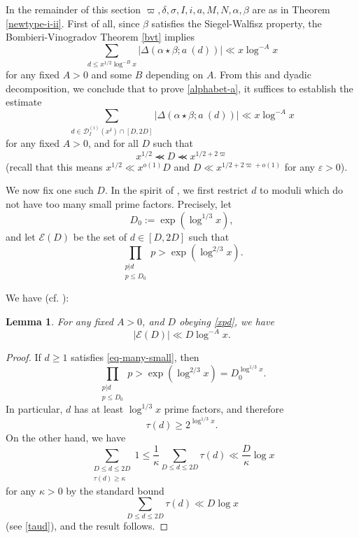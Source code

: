 \documentclass[12pt,a4paper,reqno]{amsart}
\numberwithin{equation}{section}
\theoremstyle{plain}
\newtheorem{lemma}[theorem]{Lemma}
\theoremstyle{definition}
\newcommand\eps{\varepsilon}
\newcommand{\DI}[3]{\mathcal{D}_{{#1}}^{({#2})}({#3})}
\renewcommand{\lessapprox}{\llcurly}
\begin{document}
In the remainder of this section
$\varpi,\delta,\sigma,I,i,a,M,N,\alpha,\beta$ are as in Theorem
\ref{newtype-i-ii}.  First of all, since $\beta$ satisfies the
Siegel-Walfisz property, the Bombieri-Vinogradov Theorem \ref{bvt}
implies
\begin{equation}\label{load}
  \sum_{d \leq x^{1/2} \log^{-B} x} |\Delta(\alpha \star \beta; a\ (d))| \ll x \log^{-A} x
\end{equation}
for any fixed $A >0$ and some $B$ depending on $A$.  From this and
dyadic decomposition, we conclude that to prove \eqref{alphabet-a}, it
suffices to establish the estimate
$$
 \sum_{d \in \DI{I}{i}{x^\delta} \cap [D,2D]} |\Delta(\alpha \star \beta; a\ (d))| \ll x \log^{-A} x
$$
for any fixed $A>0$, and for all $D$ such that
\begin{equation}\label{xpd}
  x^{1/2} \lessapprox D \lessapprox x^{1/2+2\varpi}
\end{equation}
(recall that this means $x^{1/2}\ll x^{o(1)}D$ and $D\ll
x^{1/2+2\varpi+o(1)}$ for any $\eps>0$).

We now fix one such $D$.  In the spirit of \cite{zhang}, we first restrict $d$ to moduli which do not have too many small prime
factors.  Precisely, let 
\begin{equation}\label{eq-d0}
D_0:=\exp(\log^{1/3} x),
\end{equation}
and let $\mathcal{E}(D)$ be the set of $d\in [D,2D]$ such that
\begin{equation}\label{eq-many-small}
\prod_{\substack{p|d\\ p\leq D_0}} p > \exp(\log^{2/3} x).
\end{equation}
\par
We have (cf. \cite[lemme 4]{ft}):

\begin{lemma}\label{roar} For any fixed $A>0$, and $D$ obeying \eqref{xpd}, we have
$$
|\mathcal{E}(D)|\ll D\log^{-A} x.
$$
\end{lemma}

\begin{proof}
  If $d\geq 1$ satisfies \eqref{eq-many-small}, then
$$
\prod_{\substack{p|d\\ p \leq D_0}} p > \exp( \log^{2/3} x ) =
D_0^{\log^{1/3} x}.
$$
In particular, $d$ has at least $\log^{1/3} x$ prime factors, and
therefore
$$ 
\tau(d) \geq 2^{\log^{1/3} x}.
$$
On the other hand, we have
$$
\sum_{\substack{D\leq d\leq 2D\\\tau(d)\geq \kappa}}1
\leq \frac{1}{\kappa}\sum_{D\leq d\leq 2D}{\tau(d)}
\ll \frac{D}{\kappa}\log x
$$
for any $\kappa>0$ by the standard bound
$$ 
\sum_{D \leq d \leq 2D} \tau(d) \ll D \log x
$$
(see \eqref{taud}), and the result follows.
\end{proof}
\end{document}
